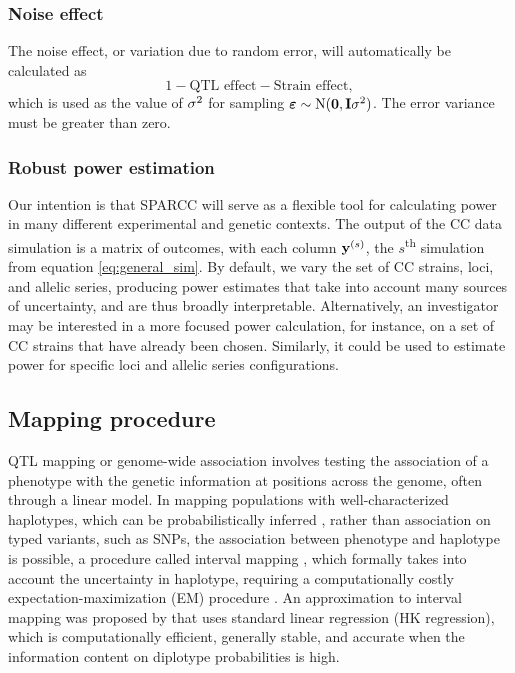 \subsubsection{Noise effect} 

The noise effect, or variation due to random error, will automatically be calculated as $$1 - \text{QTL effect} - \text{Strain effect},$$ which is used as the value of $\sigma^{2}$ for sampling $\boldsymbol{\varepsilon} \sim \text{N}(\mathbf{0}, \mathbf{I}\sigma^{2})$. The error variance must be greater than zero.

\subsubsection{Robust power estimation}

Our intention is that SPARCC will serve as a flexible tool for calculating power in many different experimental and genetic contexts. The output of the CC data simulation is a matrix of outcomes, with each column $\mathbf{y}^{(s)}$, the $s$\textsuperscript{th} simulation from equation \ref{eq:general_sim}. By default, we vary the set of CC strains, loci, and allelic series, producing power estimates that take into account many sources of uncertainty, and are thus broadly interpretable. Alternatively, an investigator may be interested in a more focused power calculation, for instance, on a set of CC strains that have already been chosen. Similarly, it could be used to estimate power for specific loci and allelic series configurations.

\subsection{Mapping procedure}

QTL mapping or genome-wide association involves testing the association of a phenotype with the genetic information at positions across the genome, often through a linear model. In mapping populations with well-characterized haplotypes, which can be probabilistically inferred \citep{Lander1987,Mott2000,Liu2010,Fu2012,Gatti2014,Zheng2015}, rather than association on typed variants, such as SNPs, the association between phenotype and haplotype is possible, a procedure called interval mapping \citep{Lander1989}, which formally takes into account the uncertainty in haplotype, requiring a computationally costly expectation-maximization (EM) procedure \citep{Dempster1977}. An approximation to interval mapping was proposed by \cite{Haley1992,Martinez1992} that uses standard linear regression (HK regression), which is computationally efficient, generally stable, and accurate when the information content on diplotype probabilities is high.

